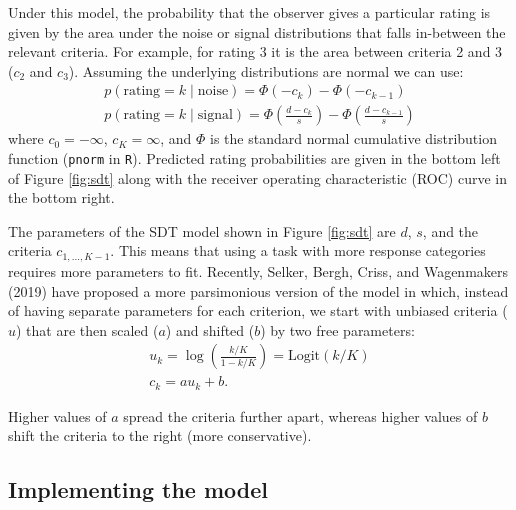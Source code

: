 \documentclass[
  english,
  ,man,floatsintext]{apa6}
\begin{document}
Under this model, the probability that the observer gives a particular rating is given by the area under the noise or signal distributions that falls in-between the relevant criteria. For example, for rating 3 it is the area between criteria 2 and 3 (\(c_2\) and \(c_3\)). Assuming the underlying distributions are normal we can use:
\[
\begin{aligned}
p(\mbox{rating} = k \mid \mbox{noise}) = \Phi(-c_{k}) - \Phi(-c_{k - 1}) \\
p(\mbox{rating} = k \mid \mbox{signal}) = \Phi{\left( \frac{d - c_{k}}{s} \right)} - \Phi{\left( \frac{d -c_{k - 1}}{s} \right)}
\end{aligned}
\]
where \(c_0 = -\infty\), \(c_K = \infty\), and \(\Phi\) is the standard normal cumulative distribution function (\texttt{pnorm} in \texttt{R}). Predicted rating probabilities are given in the bottom left of Figure \ref{fig:sdt} along with the receiver operating characteristic (ROC) curve in the bottom right.

The parameters of the SDT model shown in Figure \ref{fig:sdt} are \(d\), \(s\), and the criteria \(c_{1,...,K-1}\). This means that using a task with more response categories requires more parameters to fit. Recently, Selker, Bergh, Criss, and Wagenmakers (2019) have proposed a more parsimonious version of the model in which, instead of having separate parameters for each criterion, we start with unbiased criteria (\(u\)) that are then scaled (\(a\)) and shifted (\(b\)) by two free parameters:
\[
\begin{aligned}
u_k = \log\left( \frac{k/K}{1 - k/K} \right) = \mbox{Logit}(k/K) \\
c_k = au_k + b.
\end{aligned}
\]

Higher values of \(a\) spread the criteria further apart, whereas higher values of \(b\) shift the criteria to the right (more conservative).

\hypertarget{implementing-the-model}{%
\subsection{Implementing the model}\label{implementing-the-model}}
\end{document}
